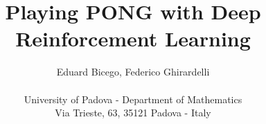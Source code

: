 \documentclass[letterpaper]{article} %
\begin{document}
%
\title{Playing PONG with Deep Reinforcement Learning}

\author{Eduard Bicego, Federico Ghirardelli\\\\
University of Padova - Department of Mathematics\\
Via Trieste, 63, 35121 Padova - Italy\\
}

\maketitle









\end{document}

